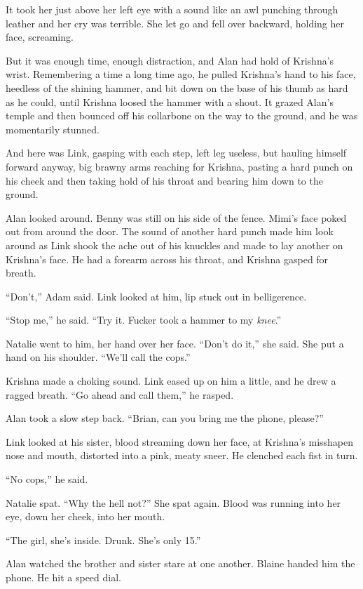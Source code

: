 It took her just above her left eye with a sound like an awl punching
through leather and her cry was terrible.  She let go and fell over
backward, holding her face, screaming.

But it was enough time, enough distraction, and Alan had hold of
Krishna's wrist.  Remembering a time a long time ago, he pulled
Krishna's hand to his face, heedless of the shining hammer, and bit
down on the base of his thumb as hard as he could, until Krishna
loosed the hammer with a shout.  It grazed Alan's temple and then
bounced off his collarbone on the way to the ground, and he was
momentarily stunned.

And here was Link, gasping with each step, left leg useless, but
hauling himself forward anyway, big brawny arms reaching for Krishna,
pasting a hard punch on his cheek and then taking hold of his throat
and bearing him down to the ground.

Alan looked around.  Benny was still on his side of the fence.  Mimi's
face poked out from around the door.  The sound of another hard punch
made him look around as Link shook the ache out of his knuckles and
made to lay another on Krishna's face.  He had a forearm across his
throat, and Krishna gasped for breath.

``Don't,'' Adam said.  Link looked at him, lip stuck out in
belligerence. 

``Stop me,'' he said.  ``Try it.  Fucker took a hammer to my
\textit{knee}.''

Natalie went to him, her hand over her face.  ``Don't do it,'' she
said.  She put a hand on his shoulder.  ``We'll call the cops.''

Krishna made a choking sound.  Link eased up on him a little, and he
drew a ragged breath.  ``Go ahead and call them,'' he rasped.

Alan took a slow step back.  ``Brian, can you bring me the phone,
please?''

Link looked at his sister, blood streaming down her face, at Krishna's
misshapen nose and mouth, distorted into a pink, meaty sneer.  He
clenched each fist in turn.

``No cops,'' he said. 

Natalie spat.  ``Why the hell not?'' She spat again.  Blood was
running into her eye, down her cheek, into her mouth.

``The girl, she's inside.  Drunk.  She's only 15.''

Alan watched the brother and sister stare at one another.  Blaine
handed him the phone.  He hit a speed dial.

